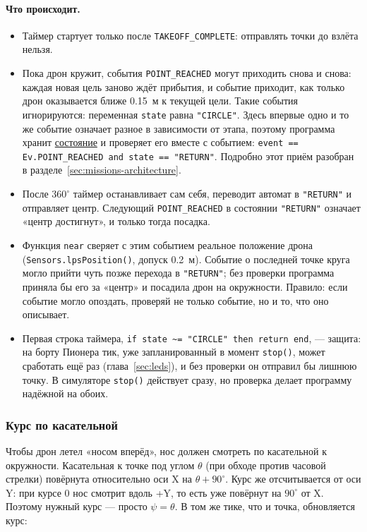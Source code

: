 \paragraph{Что происходит.}
\begin{itemize}
    \item Таймер стартует только после \verb|TAKEOFF_COMPLETE|: отправлять точки до взлёта нельзя.
    \item Пока дрон кружит, события \verb|POINT_REACHED| могут приходить снова и снова: каждая новая цель заново ждёт прибытия, и событие приходит, как только дрон оказывается ближе 0.15~м к текущей цели. Такие события игнорируются: переменная \verb|state| равна \verb|"CIRCLE"|. Здесь впервые одно и то же событие означает разное в зависимости от этапа, поэтому программа хранит \hyperlink{term:state}{состояние} и проверяет его вместе с событием: \verb|event == Ev.POINT_REACHED and state == "RETURN"|. Подробно этот приём разобран в разделе~\ref{sec:missions-architecture}.
    \item После $360^\circ$ таймер останавливает сам себя, переводит автомат в \verb|"RETURN"| и отправляет центр. Следующий \verb|POINT_REACHED| в состоянии \verb|"RETURN"| означает «центр достигнут», и только тогда посадка.
    \item Функция \verb|near| сверяет с этим событием реальное положение дрона (\verb|Sensors.lpsPosition()|, допуск 0.2~м). Событие о последней точке круга могло прийти чуть позже перехода в \verb|"RETURN"|; без проверки программа приняла бы его за «центр» и посадила дрон на окружности. Правило: если событие могло опоздать, проверяй не только событие, но и то, что оно описывает.
    \item Первая строка таймера, \verb|if state ~= "CIRCLE" then return end|, --- защита: на борту Пионера тик, уже запланированный в момент \verb|stop()|, может сработать ещё раз (глава~\ref{sec:leds}), и без проверки он отправил бы лишнюю точку. В симуляторе \verb|stop()| действует сразу, но проверка делает программу надёжной на обоих.
\end{itemize}

\subsubsection*{Курс по касательной}

Чтобы дрон летел «носом вперёд», нос должен смотреть по касательной к окружности. Касательная к точке под углом $\theta$ (при обходе против часовой стрелки) повёрнута относительно оси X на $\theta + 90^\circ$. Курс же отсчитывается от оси Y: при курсе 0 нос смотрит вдоль +Y, то есть уже повёрнут на $90^\circ$ от X. Поэтому нужный курс --- просто $\psi = \theta$. В том же тике, что и точка, обновляется курс:

